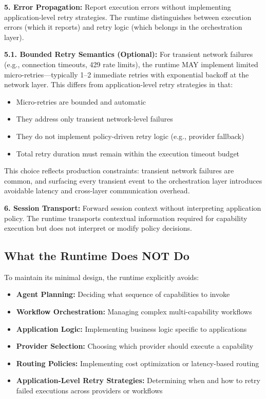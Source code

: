 \textbf{5. Error Propagation:} Report execution errors without implementing application-level retry strategies. The runtime distinguishes between execution errors (which it reports) and retry logic (which belongs in the orchestration layer).

\textbf{5.1. Bounded Retry Semantics (Optional):} For transient network failures (e.g., connection timeouts, 429 rate limits), the runtime MAY implement limited micro-retries---typically 1--2 immediate retries with exponential backoff at the network layer. This differs from application-level retry strategies in that:
\begin{itemize}
    \item Micro-retries are bounded and automatic
    \item They address only transient network-level failures
    \item They do not implement policy-driven retry logic (e.g., provider fallback)
    \item Total retry duration must remain within the execution timeout budget
\end{itemize}

This choice reflects production constraints: transient network failures are common, and surfacing every transient event to the orchestration layer introduces avoidable latency and cross-layer communication overhead.

\textbf{6. Session Transport:} Forward session context without interpreting application policy. The runtime transports contextual information required for capability execution but does not interpret or modify policy decisions.

\subsection{What the Runtime Does NOT Do}

To maintain its minimal design, the runtime explicitly avoids:
\begin{itemize}
    \item \textbf{Agent Planning:} Deciding what sequence of capabilities to invoke
    \item \textbf{Workflow Orchestration:} Managing complex multi-capability workflows
    \item \textbf{Application Logic:} Implementing business logic specific to applications
    \item \textbf{Provider Selection:} Choosing which provider should execute a capability
    \item \textbf{Routing Policies:} Implementing cost optimization or latency-based routing
    \item \textbf{Application-Level Retry Strategies:} Determining when and how to retry failed executions across providers or workflows
\end{itemize}

